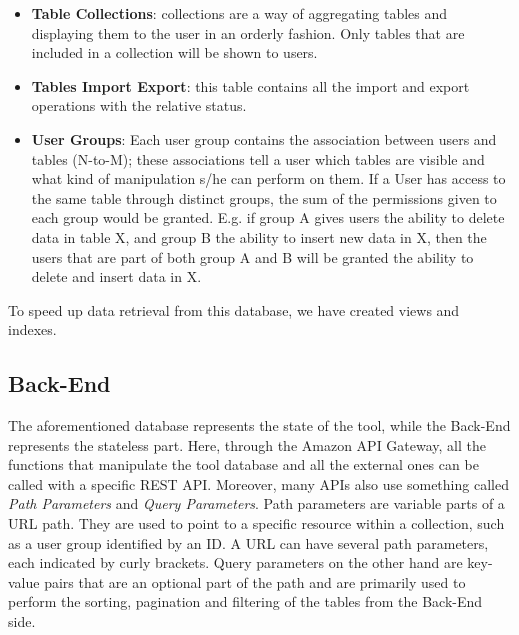 \begin{itemize}
    \item \textbf{Table Collections}: collections are a way of aggregating tables and displaying them to the user in an orderly fashion. Only tables that are included in a collection will be shown to users.
    
    \item \textbf{Tables Import Export}: this table contains all the import and export operations  with the relative status.
    
    \item \textbf{User Groups}: Each user group contains the association between users and tables (N-to-M); these associations tell a user which tables are visible and what kind of manipulation s/he can perform on them. If a User has access to the same table through distinct groups, the sum of the permissions given to each group would be granted. E.g. if group A gives users the ability to delete data in table X, and group B the ability to insert new data in X, then the users that are part of both group A and B will be granted the ability to delete and insert data in X.
\end{itemize}


To speed up data retrieval from this database, we have created views and indexes. 


\subsection{Back-End}
The aforementioned database represents the state of the tool, while the Back-End represents the stateless part. Here, through the Amazon API Gateway, all the functions that manipulate the tool database and all the external ones can be called with a specific REST API. Moreover, many APIs also use something called \emph{Path Parameters} and \emph{Query Parameters}. Path parameters are variable parts of a URL path. They are used to point to a specific resource within a collection, such as a user group identified by an ID. A URL can have several path parameters, each indicated by curly brackets. Query parameters on the other hand are key-value pairs that are an optional part of the path and are primarily used to perform the sorting, pagination and filtering of the tables from the Back-End side.

